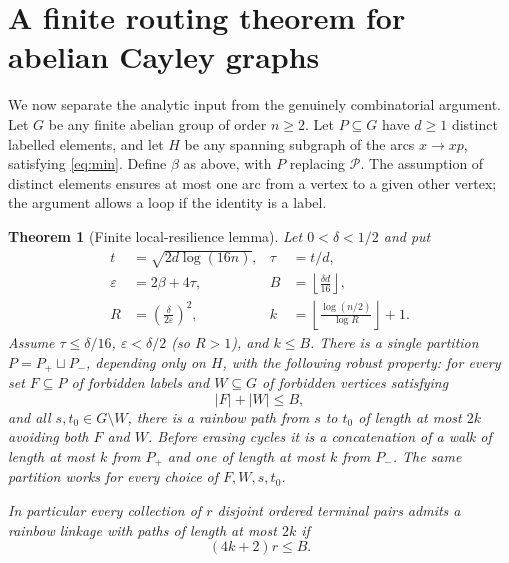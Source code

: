 \documentclass[11pt]{article}
\newtheorem{theorem}{Theorem}[section]
\theoremstyle{remark}\newtheorem{remark}[theorem]{Remark}
\newcommand{\Pp}{\mathcal P}
\newcommand{\abs}[1]{\lvert#1\rvert}
\newcommand{\ee}{\varepsilon}
\begin{document}
\section{A finite routing theorem for abelian Cayley graphs}
We now separate the analytic input from the genuinely combinatorial argument. Let $G$ be any finite abelian group of order $n\ge2$. Let $P\subseteq G$ have $d\ge1$ distinct labelled elements, and let $H$ be any spanning subgraph of the arcs $x\to xp$, satisfying \eqref{eq:min}. Define $\beta$ as above, with $P$ replacing $\Pp$. The assumption of distinct elements ensures at most one arc from a vertex to a given other vertex; the argument allows a loop if the identity is a label.

\begin{theorem}[Finite local-resilience lemma]\label{thm:finite}
Let $0<\delta<1/2$ and put
\begin{align*}
 t&=\sqrt{2d\log(16n)}, & \tau&=t/d,\\
 \ee&=2\beta+4\tau, & B&=\left\lfloor\frac{\delta d}{16}\right\rfloor,\\
 R&=\left(\frac{\delta}{2\ee}\right)^2,&
 k&=\left\lfloor\frac{\log(n/2)}{\log R}\right\rfloor+1.
\end{align*}
Assume $\tau\le\delta/16$, $\ee<\delta/2$ (so $R>1$), and $k\le B$. There is a single partition $P=P_+\sqcup P_-$, depending only on $H$, with the following robust property: for every set $F\subseteq P$ of forbidden labels and $W\subseteq G$ of forbidden vertices satisfying
\begin{equation}\label{eq:budget}
 \abs F+\abs W\le B,
\end{equation}
and all $s,t_0\in G\setminus W$, there is a rainbow path from $s$ to $t_0$ of length at most $2k$ avoiding both $F$ and $W$. Before erasing cycles it is a concatenation of a walk of length at most $k$ from $P_+$ and one of length at most $k$ from $P_-$. The same partition works for every choice of $F,W,s,t_0$.

In particular every collection of $r$ disjoint ordered terminal pairs admits a rainbow linkage with paths of length at most $2k$ if
\begin{equation}\label{eq:packing}
 (4k+2)r\le B.
\end{equation}
\end{theorem}
\end{document}
